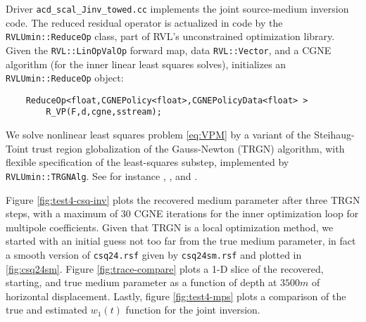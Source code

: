 Driver {\tt acd\_scal\_Jinv\_towed.cc} implements the joint source-medium inversion code.
The reduced residual operator is actualized in code by the {\tt RVLUmin::ReduceOp} class, part of RVL's unconstrained optimization library.
Given the {\tt RVL::LinOpValOp} forward map, data {\tt RVL::Vector}, and a CGNE algorithm (for the inner linear least squares solves), initializes an {\tt RVLUmin::ReduceOp} object:
{\small
\begin{verbatim}
    ReduceOp<float,CGNEPolicy<float>,CGNEPolicyData<float> > 
        R_VP(F,d,cgne,sstream);
\end{verbatim}
}

We solve nonlinear least squares problem \ref{eq:VPM} by a variant of the Steihaug-Toint trust region globalization of the Gauss-Newton (TRGN) algorithm, with flexible specification of the least-squares substep, implemented by {\tt RVLUmin::TRGNAlg}.
See for instance \cite{Steihaug:83}, \cite{ConnGouldToint:00}, and \cite{NocedalWright}.


Figure \ref{fig:test4-csq-inv} plots the recovered medium parameter after three TRGN steps, with a maximum of 30 CGNE iterations for the inner optimization loop for multipole coefficients.
Given that TRGN is a local optimization method, we started with an initial guess not too far from the true medium parameter, in fact a smooth version of {\tt csq24.rsf} given by {\tt csq24sm.rsf} and plotted in \ref{fig:csq24sm}.
Figure \ref{fig:trace-compare} plots a 1-D slice of the recovered, starting, and true medium parameter as a function of depth at $3500m$ of horizontal displacement.
Lastly, figure \ref{fig:test4-mps} plots a comparison of the true and estimated $w_1(t)$ function for the joint inversion. 



